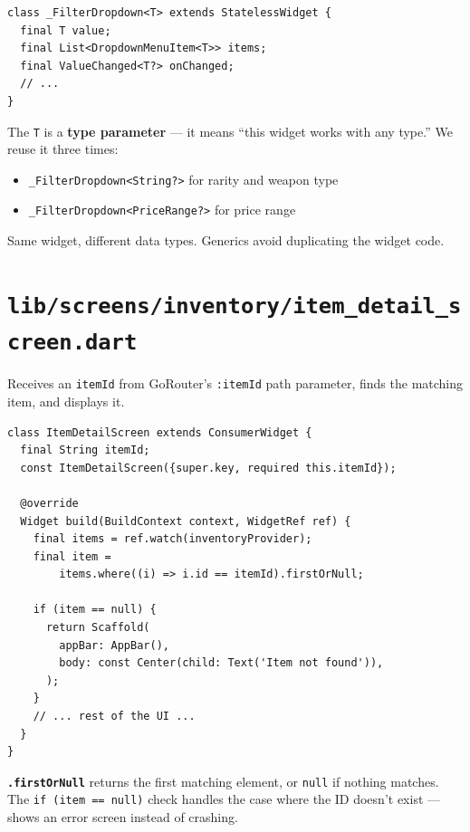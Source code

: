 \documentclass[11pt, a4paper]{article}
\begin{document}
\begin{conceptbox}[title=\textbf{Generic Widget \texttt{<T>} --- \texttt{\_FilterDropdown<T>}}]
\begin{lstlisting}[numbers=none]
class _FilterDropdown<T> extends StatelessWidget {
  final T value;
  final List<DropdownMenuItem<T>> items;
  final ValueChanged<T?> onChanged;
  // ...
}
\end{lstlisting}

The \texttt{T} is a \textbf{type parameter} --- it means ``this widget works with any type.'' We reuse it three times:
\begin{itemize}
    \item \texttt{\_FilterDropdown<String?>} for rarity and weapon type
    \item \texttt{\_FilterDropdown<PriceRange?>} for price range
\end{itemize}

Same widget, different data types. Generics avoid duplicating the widget code.
\end{conceptbox}

\newpage

\section{\texttt{lib/screens/inventory/item\_detail\_screen.dart}}

Receives an \texttt{itemId} from GoRouter's \texttt{:itemId} path parameter, finds the matching item, and displays it.

\begin{lstlisting}
class ItemDetailScreen extends ConsumerWidget {
  final String itemId;
  const ItemDetailScreen({super.key, required this.itemId});

  @override
  Widget build(BuildContext context, WidgetRef ref) {
    final items = ref.watch(inventoryProvider);
    final item =
        items.where((i) => i.id == itemId).firstOrNull;

    if (item == null) {
      return Scaffold(
        appBar: AppBar(),
        body: const Center(child: Text('Item not found')),
      );
    }
    // ... rest of the UI ...
  }
}
\end{lstlisting}

\textbf{\texttt{.firstOrNull}} returns the first matching element, or \texttt{null} if nothing matches. The \texttt{if (item == null)} check handles the case where the ID doesn't exist --- shows an error screen instead of crashing.
\end{document}
